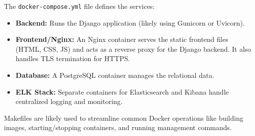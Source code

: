 The \texttt{docker-compose.yml} file defines the services:
\begin{itemize}
    \item \textbf{Backend:} Runs the Django application (likely using Gunicorn or Uvicorn).
    \item \textbf{Frontend/Nginx:} An Nginx container serves the static frontend files (HTML, CSS, JS) and acts as a reverse proxy for the Django backend. It also handles TLS termination for HTTPS.
    \item \textbf{Database:} A PostgreSQL container manages the relational data.
    \item \textbf{ELK Stack:} Separate containers for Elasticsearch and Kibana handle centralized logging and monitoring.
\end{itemize}
Makefiles are likely used to streamline common Docker operations like building images, starting/stopping containers, and running management commands.